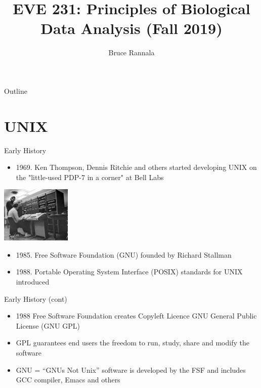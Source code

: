\documentclass[xetex]{beamer}
\author{Bruce Rannala}
\date{}
\title{EVE 231: Principles of Biological Data Analysis (Fall 2019)}
\begin{document}
\maketitle
\begin{frame}{Outline}
\tableofcontents
\end{frame}


\section{UNIX}
\label{sec:orgb4078c5}
\begin{frame}[label={sec:org5ccfe16}]{Early History}
\begin{itemize}
\item 1969. Ken Thompson, Dennis Ritchie and others started developing UNIX on the "little-used PDP-7 in a corner" at Bell Labs
\end{itemize}
\begin{center}
\includegraphics[width=0.25\textwidth]{./figs/ThompsonRitchieatPDP-11.jpg}
\end{center} 
\begin{itemize}
\item 1985. Free Software Foundation (GNU) founded by Richard Stallman
\item 1988. Portable Operating System Interface (POSIX) standards for UNIX introduced
\end{itemize}
\end{frame}
\begin{frame}[label={sec:orgf99f574}]{Early History (cont)}
\begin{itemize}
\item 1988 Free Software Foundation creates Copyleft Licence GNU General Public License (GNU GPL)
\item GPL guarantees end users the freedom to run, study, share and modify the software
\item GNU = ``GNUs Not Unix'' software is developed by the FSF and includes GCC compiler, Emacs and others
\end{itemize}
\end{frame}
\end{document}

